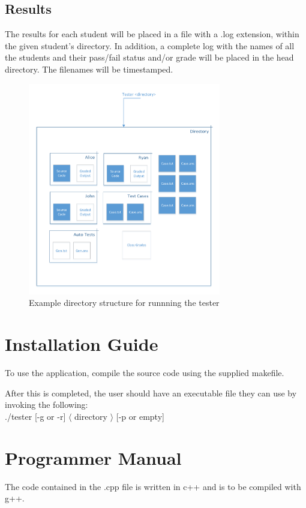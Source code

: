 \subsection{Results}
The results for each student will be placed in a file with a .log extension, within the given student's directory. 
In addition, a complete log with the names of all the students and their pass/fail status and/or grade will be placed 
in the head directory. The filenames will be timestamped.

\begin{figure}[H]
\begin{center}
\includegraphics[width=0.75\textwidth]{./Dir_struct}
\end{center}
\caption{Example directory structure for runnning the tester \label{dir}}
\end{figure}

\section{Installation Guide}
To use the application, compile the source code using the supplied makefile.

After this is completed, the user should have an
executable file they can use by invoking the following: \\
./tester [-g or -r] $\langle$ directory $\rangle$ [-p or empty]

\section{Programmer Manual}
The code contained in the .cpp file is written in c++ and is to be compiled with g++.

